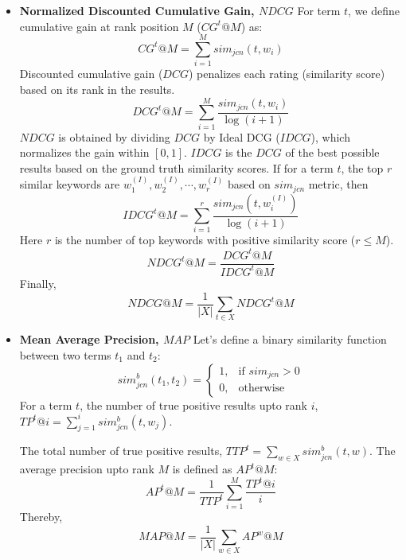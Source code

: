 \documentclass[sigconf]{acmart}
\begin{document}
\begin{itemize}
	\item{\textbf{Normalized Discounted Cumulative Gain, $NDCG$}}
	For term $t$, we define cumulative gain at rank position $M$ ($CG^t@M$) as:
	\begin{equation}
	CG^t@M = \sum_{i=1}^{M} sim_{jcn}(t, w_i)
	\end{equation}
	Discounted cumulative gain ($DCG$) penalizes each rating (similarity score) based on its rank in the results. 
	\begin{equation}
	DCG^t@M = \sum_{i=1}^{M} \frac{sim_{jcn}(t, w_i)}{\log{ (i+1)}}
	\end{equation}
	$NDCG$ is obtained by dividing $DCG$ by Ideal DCG ($IDCG$), which normalizes the gain within $[0,1]$. $IDCG$ is the $DCG$ of the best possible results based on the ground truth similarity scores. If for a term $t$, the top $r$ similar keywords are $w^{(I)}_1, w^{(I)}_2, \cdots, w^{(I)}_r$ based on $sim_{jcn}$ metric, then
	\begin{equation}
	IDCG^t@M = \sum_{i=1}^{r} \frac{sim_{jcn}(t, w^{(I)}_i)}{\log{ (i+1)}}
	\end{equation}
	Here $r$ is the number of top keywords with positive similarity score ($ r \le M$). 
	\begin{equation}
	 NDCG^t@M = \frac{DCG^t@M}{IDCG^t@M}
	\end{equation}
	Finally,
	\begin{equation}
	NDCG@M = \frac{1}{|X|} \sum_{t \in X} NDCG^t@M
	\end{equation}
	
	\item{\textbf{Mean Average Precision, $MAP$}}
	Let's define a binary similarity function between two terms $t_1$ and $t_2$:
	\begin{equation}
	sim^b_{jcn}(t_1, t_2)= 
	\begin{cases}
	1,& \text{if } sim_{jcn}> 0\\
	0,              & \text{otherwise}
	\end{cases}
	\end{equation}
	For a term $t$, the number of true positive results upto rank $i$, $TP^t@i = \sum_{j=1}^{i} sim^b_{jcn} (t, w_j)$. 
	
	The total number of true positive results, 
	$TTP^t = \sum_{w \in X} sim^b_{jcn} (t, w)$. The average precision upto rank $M$ is defined as $AP^t@M$:
	\begin{equation}
	AP^t@M = \frac{1}{TTP^t} \sum_{i=1}^M \frac{TP^t@i}{i}
	\end{equation}
	Thereby,
	\begin{equation}
	MAP@M = \frac{1}{|X|} \sum_{w \in X} AP^w@M
	\end{equation}
	
\end{itemize}
\end{document}
